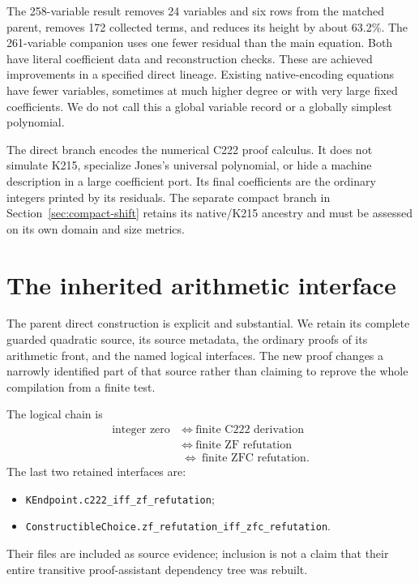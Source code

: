 \documentclass[11pt]{article}
\newcommand{\code}[1]{\texttt{\small #1}}
\begin{document}
The 258-variable result removes 24 variables and six rows from the matched
parent, removes 172 collected terms, and reduces its height by about
63.2\%. The 261-variable companion uses one fewer residual than the main
equation. Both have literal coefficient data and reconstruction checks.
These are achieved improvements in a specified direct lineage. Existing
native-encoding equations have fewer variables, sometimes at much higher
degree or with very large fixed coefficients. We do not call this a global
variable record or a globally simplest polynomial.

The direct branch encodes the numerical C222 proof calculus. It does not
simulate K215, specialize Jones's universal polynomial, or hide a machine
description in a large coefficient port. Its final coefficients are the
ordinary integers printed by its residuals. The separate compact branch
in Section~\ref{sec:compact-shift} retains its native/K215 ancestry and
must be assessed on its own domain and size metrics.

\section{The inherited arithmetic interface}

The parent direct construction is explicit and substantial. We retain its
complete guarded quadratic source, its source metadata, the ordinary
proofs of its arithmetic front, and the named logical interfaces. The
new proof changes a narrowly identified part of that source rather than
claiming to reprove the whole compilation from a finite test.

The logical chain is
\[
 \begin{aligned}
 \text{integer zero}&\ \Longleftrightarrow\ \text{finite C222 derivation}\\
 &\ \Longleftrightarrow\ \text{finite ZF refutation}\\
 &\ \Longleftrightarrow\ \text{finite ZFC refutation}.
 \end{aligned}
\]
The last two retained interfaces are:
\begin{itemize}
\item \code{KEndpoint.c222\_iff\_zf\_refutation};
\item \code{ConstructibleChoice.zf\_refutation\_iff\_zfc\_refutation}.
\end{itemize}
Their files are included as source evidence; inclusion is not a claim
that their entire transitive proof-assistant dependency tree was rebuilt.
\end{document}
